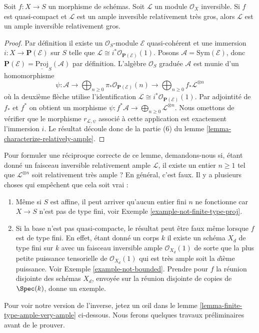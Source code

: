 \begin{lemma}
\label{lemma-ample-very-ample}
\begin{reference}
\cite[II, Proposition 4.6.2]{EGA}
\end{reference}
Soit $f : X \to S$ un morphisme de schémas. Soit
$\mathcal{L}$ un module $\mathcal{O}_X$ inversible. Si $f$
est quasi-compact et $\mathcal{L}$ est un ample inversible
relativement très gros, alors $\mathcal{L}$ est un ample inversible
relativement gros.
\end{lemma}

\begin{proof}
Par définition il existe un $\mathcal{O}_S$-module
$\mathcal{E}$ quasi-cohérent et une immersion
$i : X \to \mathbf{P}(\mathcal{E})$
sur $S$ telle que $\mathcal{L} \cong i^*\mathcal{O}_{\mathbf{P}(\mathcal{E})}(1)$.
Posons $\mathcal{A} = \text{Sym}(\mathcal{E})$, donc
$\mathbf{P}(\mathcal{E}) = \underline{\text{Proj}}_S(\mathcal{A})$ par définition. L'algèbre $\mathcal{O}_S$
graduée $\mathcal{A}$ est munie d'un
homomorphisme
$$
\psi :
\mathcal{A} \to
\bigoplus\nolimits_{n \geq 0}
\pi_*\mathcal{O}_{\mathbf{P}(\mathcal{E})}(n) \to
\bigoplus\nolimits_{n \geq 0}
f_*\mathcal{L}^{\otimes n}
$$
où la deuxième flèche utilise l'identification
$\mathcal{L} \cong i^*\mathcal{O}_{\mathbf{P}(\mathcal{E})}(1)$. Par adjointité de $f_*$
et $f^*$ on obtient un morphisme
$\psi : f^*\mathcal{A} \to \bigoplus_{n \geq 0}\mathcal{L}^{\otimes n}$. Nous omettons de vérifier que le
morphisme $r_{\mathcal{L}, \psi}$ associé à cette application
est exactement l'immersion $i$.
Le résultat découle
donc de la partie (6) du lemme \ref{lemma-characterize-relatively-ample}.
\end{proof}

\noindent
Pour formuler une réciproque correcte de ce lemme, demandons-nous
si, étant donné un faisceau inversible relativement ample
$\mathcal{L}$, il existe un entier $n \geq 1$
tel que $\mathcal{L}^{\otimes n}$ soit relativement très ample ? En général, c'est
faux. Il y a plusieurs choses qui empêchent que cela soit vrai :
\begin{enumerate}
\item Même si $S$ est affine, il peut arriver qu'aucun entier
fini $n$ ne fonctionne car $X \to S$ n'est
pas de type fini, voir Exemple \ref{example-not-finite-type-proj}.
\item Si la base n'est pas quasi-compacte, le résultat peut être faux
même lorsque $f$ est de type fini. En effet, étant
donné un corps $k$ il existe un schéma $X_d$ de type fini
sur $k$ avec un faisceau inversible ample $\mathcal{O}_{X_d}(1)$ de sorte que
la plus petite puissance tensorielle de $\mathcal{O}_{X_d}(1)$ qui est très ample soit la
$d$ième puissance. Voir Exemple \ref{example-not-bounded}.
Prendre pour $f$ la réunion disjointe des schémas $X_d$, envoyée
sur la réunion disjointe de copies de $\Spec(k)$, donne un exemple.
\end{enumerate}
Pour voir notre version de l'inverse, jetez un œil
dans le lemme \ref{lemma-finite-type-ample-very-ample} ci-dessous. Nous ferons quelques
travaux préliminaires avant de le prouver.

